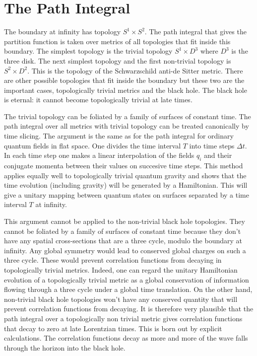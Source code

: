\documentclass[aps,prd,groupedaddress,showpacs,12pt,nofootinbib]{revtex4-1}
\begin{document}
\section{ The Path Integral }

The boundary at infinity has topology $S^1 \times S^2$. The path integral that gives the partition function is taken over metrics of all topologies that fit inside this boundary. The simplest topology is the trivial topology $S^1 \times D^3$ where $D^3$ is the three disk. The next simplest topology and the first non-trivial topology is $S^2 \times D^2$. This is the topology of the Schwarzschild anti-de Sitter metric. There are other possible topologies that fit inside the boundary but these two are the important cases, topologically trivial metrics and the black hole. The black hole is eternal: it cannot become topologically trivial at late times.

The trivial topology can be foliated by a family of surfaces of constant time. The path integral over all metrics with trivial topology can be treated canonically by time slicing. The argument is the same as for the path integral for ordinary quantum fields in flat space. One divides the time interval $T$ into time steps $\Delta t$. In each time step one makes a linear interpolation of the fields $q_i$ and their conjugate momenta between their values on succesive time steps. This method applies equally well to topologically trivial quantum gravity and shows that the time evolution (including gravity) will be generated by 
a Hamiltonian. This will give a unitary mapping between quantum states on surfaces separated by a time interval $T$ at infinity. 

This argument cannot be applied to the non-trivial black hole topologies. They cannot be foliated by a family of surfaces of constant time because they don't have any spatial cross-sections that are a three cycle, modulo the boundary at infinity. Any global symmetry would lead to conserved global charges on such a three cycle. These would prevent correlation functions from decaying in topologically trivial metrics. Indeed, one can regard the unitary Hamiltonian evolution of a topologically trivial metric as a global conservation of information flowing through a three cycle under a global time translation. On the other hand, non-trivial black hole topologies won't have any conserved quantity that will prevent correlation functions from decaying. It is therefore very plausible that the path integral over a topologically non trivial metric gives correlation functions that decay to zero at late Lorentzian times. This is  born out by explicit calculations. The correlation functions decay as more and more of the wave falls through the horizon into the black hole.   
\end{document}
